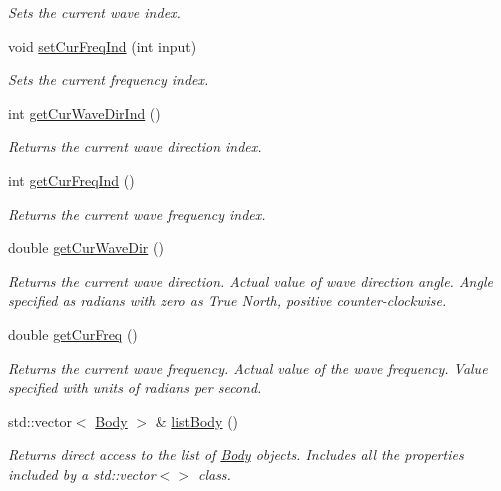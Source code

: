 \begin{DoxyCompactItemize}
\begin{DoxyCompactList}\small\item\em Sets the current wave index. \end{DoxyCompactList}\item 
void \hyperlink{classosea_1_1ofreq_1_1_system_a76c849ddc8e6d9cc628f4208df2ea950}{set\-Cur\-Freq\-Ind} (int input)
\begin{DoxyCompactList}\small\item\em Sets the current frequency index. \end{DoxyCompactList}\item 
int \hyperlink{classosea_1_1ofreq_1_1_system_aff94e0e384f1c55cccfa0f0238e445b8}{get\-Cur\-Wave\-Dir\-Ind} ()
\begin{DoxyCompactList}\small\item\em Returns the current wave direction index. \end{DoxyCompactList}\item 
int \hyperlink{classosea_1_1ofreq_1_1_system_ae348a554ad912c084343e96c3a7b8647}{get\-Cur\-Freq\-Ind} ()
\begin{DoxyCompactList}\small\item\em Returns the current wave frequency index. \end{DoxyCompactList}\item 
double \hyperlink{classosea_1_1ofreq_1_1_system_aea8c3cb08e84051a4325c06c5a7185fa}{get\-Cur\-Wave\-Dir} ()
\begin{DoxyCompactList}\small\item\em Returns the current wave direction. Actual value of wave direction angle. Angle specified as radians with zero as True North, positive counter-\/clockwise. \end{DoxyCompactList}\item 
double \hyperlink{classosea_1_1ofreq_1_1_system_ac4dec1ad6e8745d87f18dfb91bbd8f6b}{get\-Cur\-Freq} ()
\begin{DoxyCompactList}\small\item\em Returns the current wave frequency. Actual value of the wave frequency. Value specified with units of radians per second. \end{DoxyCompactList}\item 
std\-::vector$<$ \hyperlink{classosea_1_1ofreq_1_1_body}{Body} $>$ \& \hyperlink{classosea_1_1ofreq_1_1_system_adf2b36b23ce4bca11639f8dd8bb48918}{list\-Body} ()
\begin{DoxyCompactList}\small\item\em Returns direct access to the list of \hyperlink{classosea_1_1ofreq_1_1_body}{Body} objects. Includes all the properties included by a std\-::vector$<$$>$ class. \end{DoxyCompactList}\item 

\end{DoxyCompactItemize}
